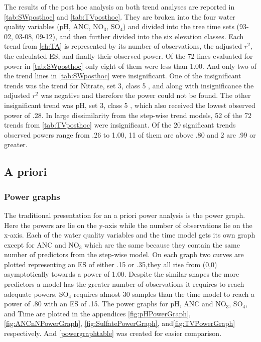 The results of the post hoc analysis on both trend analyses are reported in  \autoref{tab:SWposthoc} and \autoref{tab:TVposthoc}.
They are broken into the four water quality variables (pH, ANC, NO$_3$, SO$_4$) and divided into the tree time sets (93-02, 03-08, 09-12), and then further divided into the six elevation classes.
Each trend from \autoref{ch:TA} is represented by its number of observations, the adjusted $r^2$, the calculated ES, and finally their observed power.
Of the 72 lines evaluated for power in \autoref{tab:SWposthoc} only eight of them were less than 1.00.
And only two of the trend lines in \autoref{tab:SWposthoc} were insignificant.
One of the insignificant trends was the trend for Nitrate, set 3, class 5 , and along with insignificance the adjusted $r^2$ was negative and therefore the power could not be found.
The other insignificant trend was pH, set 3, class 5 , which also received the lowest observed power of .28.
In large dissimilarity from the step-wise trend models, 52 of the 72 trends from \autoref{tab:TVposthoc} were insignificant.
Of the 20 significant trends observed powers range from .26 to 1.00, 11 of them are above .80 and 2 are .99 or greater.

\subsection{A priori}

\subsubsection{Power graphs}

The traditional presentation for an a priori power analysis is the power graph.
Here the powers are lie on the y-axis while the number of observations lie on the x-axis.
Each of the water quality variables and the time model gets its own graph except for ANC and NO$_3$ which are the same because they contain the same number of predictors from the step-wise model.
On each graph two curves are plotted representing an ES of either .15 or .35,they all rise from (0,0) asymptotically towards a power of 1.00.
Despite the similar shapes the more predictors a model has the greater number of  observations it requires to reach adequate powers, SO$_4$ requires almost 30 samples than the time model to reach a power of .80 with an ES of .15.
The power graphs for pH, ANC and NO$_3$, SO$_4$, and Time are plotted in the appendices \autoref{fig:pHPowerGraph}, \autoref{fig:ANCnNPowerGraph}, \autoref{fig:SulfatePowerGraph}, and\autoref{fig:TVPowerGraph} respectively.
And \autoref{powergraphtable} was created for easier comparison.


